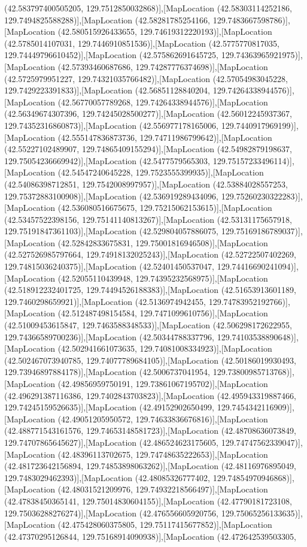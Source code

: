 (42.583797400505205, 129.7512850032868)],[MapLocation (42.58303114252186, 129.7494825588288)],[MapLocation (42.58281785254166, 129.7483667598786)],[MapLocation (42.580515926433655, 129.74619312220193)],[MapLocation (42.5785014107031, 129.7446910851536)],[MapLocation (42.5775770817035, 129.74449796610452)],[MapLocation (42.575862691645725, 129.74363965921975)],[MapLocation (42.57393460687686, 129.74287776374698)],[MapLocation (42.5725979951227, 129.74321035766482)],[MapLocation (42.57054983045228, 129.7429223391833)],[MapLocation (42.56851128840204, 129.74264338944576)],[MapLocation (42.56770057789268, 129.74264338944576)],[MapLocation (42.56349674307396, 129.74245028500277)],[MapLocation (42.56012245937367, 129.74352316860873)],[MapLocation (42.556977178165006, 129.7440917969199)],[MapLocation (42.555147836873736, 129.74711986799642)],[MapLocation (42.55227102489907, 129.74865409155294)],[MapLocation (42.54982879198637, 129.75054236669942)],[MapLocation (42.5477579565303, 129.75157233496114)],[MapLocation (42.54547240645228, 129.7523555399935)],[MapLocation (42.54086398712851, 129.7542008997957)],[MapLocation (42.53884028557253, 129.75372883100908)],[MapLocation (42.536919289434096, 129.75260230322283)],[MapLocation (42.536080516675675, 129.75215062153615)],[MapLocation (42.53457522398156, 129.75141140813267)],[MapLocation (42.53131175657918, 129.75191847361103)],[MapLocation (42.529804057886075, 129.75169186789037)],[MapLocation (42.52842833675831, 129.75001816946508)],[MapLocation (42.527526985797664, 129.74918132025243)],[MapLocation (42.52722507402269, 129.74815036240375)],[MapLocation (42.52401450537047, 129.74416690241094)],[MapLocation (42.52055110439948, 129.74395232568975)],[MapLocation (42.518912232401725, 129.74494526188383)],[MapLocation (42.51653913601189, 129.7460298659921)],[MapLocation (42.5136974942455, 129.74783952192766)],[MapLocation (42.512487498154584, 129.7471099610756)],[MapLocation (42.51009453615847, 129.7463588348533)],[MapLocation (42.506298172622955, 129.74366589700236)],[MapLocation (42.50344788337796, 129.74103538890648)],[MapLocation (42.502941661073635, 129.74081008334923)],[MapLocation (42.502467073940785, 129.74077789684105)],[MapLocation (42.50186019930493, 129.73946897884178)],[MapLocation (42.5006737041954, 129.73800985713768)],[MapLocation (42.49856959750191, 129.73861067195702)],[MapLocation (42.496291387116386, 129.7402843703823)],[MapLocation (42.495943319887466, 129.74245159526635)],[MapLocation (42.49152902650499, 129.7454342116909)],[MapLocation (42.49051205950572, 129.74633836676816)],[MapLocation (42.488771543161576, 129.74653148581723)],[MapLocation (42.48708636073849, 129.74707865645627)],[MapLocation (42.486524623175605, 129.74747562339047)],[MapLocation (42.48396113702675, 129.74748635222653)],[MapLocation (42.481723642156894, 129.74853898063262)],[MapLocation (42.48116976895049, 129.7483029462393)],[MapLocation (42.48085326777402, 129.74854970946868)],[MapLocation (42.48031521209976, 129.74932218566497)],[MapLocation (42.47838450365141, 129.75014830604155)],[MapLocation (42.47790181723108, 129.75036288276274)],[MapLocation (42.476556605920756, 129.75065256133635)],[MapLocation (42.475428060375805, 129.75117415677852)],[MapLocation (42.47370295126844, 129.75168914090938)],[MapLocation (42.472642539503305, 